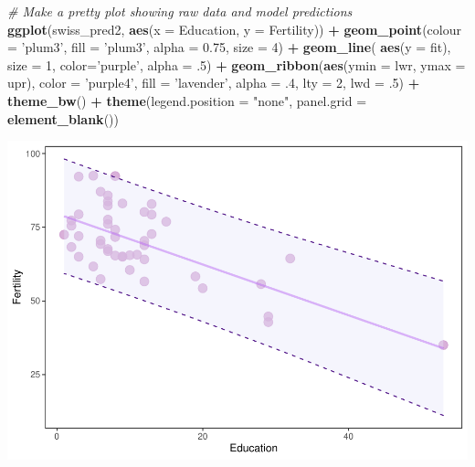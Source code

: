 \documentclass[
]{book}
\newenvironment{Shaded}{\begin{snugshade}}{\end{snugshade}}
\newcommand{\CommentTok}[1]{\textcolor[rgb]{0.56,0.35,0.01}{\textit{#1}}}
\newcommand{\DataTypeTok}[1]{\textcolor[rgb]{0.13,0.29,0.53}{#1}}
\newcommand{\DecValTok}[1]{\textcolor[rgb]{0.00,0.00,0.81}{#1}}
\newcommand{\FloatTok}[1]{\textcolor[rgb]{0.00,0.00,0.81}{#1}}
\newcommand{\KeywordTok}[1]{\textcolor[rgb]{0.13,0.29,0.53}{\textbf{#1}}}
\newcommand{\NormalTok}[1]{#1}
\newcommand{\OperatorTok}[1]{\textcolor[rgb]{0.81,0.36,0.00}{\textbf{#1}}}
\newcommand{\StringTok}[1]{\textcolor[rgb]{0.31,0.60,0.02}{#1}}
\begin{document}
\begin{Shaded}
\begin{Highlighting}[]
\CommentTok{# Make a pretty plot showing raw data and model predictions}
\KeywordTok{ggplot}\NormalTok{(swiss_pred2, }\KeywordTok{aes}\NormalTok{(}\DataTypeTok{x =}\NormalTok{ Education, }\DataTypeTok{y =}\NormalTok{ Fertility)) }\OperatorTok{+}
\StringTok{  }\KeywordTok{geom_point}\NormalTok{(}\DataTypeTok{colour =} \StringTok{'plum3'}\NormalTok{, }\DataTypeTok{fill =} \StringTok{'plum3'}\NormalTok{, }\DataTypeTok{alpha =} \FloatTok{0.75}\NormalTok{, }\DataTypeTok{size =} \DecValTok{4}\NormalTok{) }\OperatorTok{+}
\StringTok{  }\KeywordTok{geom_line}\NormalTok{( }\KeywordTok{aes}\NormalTok{(}\DataTypeTok{y =}\NormalTok{ fit), }\DataTypeTok{size =} \DecValTok{1}\NormalTok{, }\DataTypeTok{color=}\StringTok{'purple'}\NormalTok{, }\DataTypeTok{alpha =} \FloatTok{.5}\NormalTok{) }\OperatorTok{+}
\StringTok{  }\KeywordTok{geom_ribbon}\NormalTok{(}\KeywordTok{aes}\NormalTok{(}\DataTypeTok{ymin =}\NormalTok{ lwr, }\DataTypeTok{ymax =}\NormalTok{ upr), }
              \DataTypeTok{color =} \StringTok{'purple4'}\NormalTok{, }
              \DataTypeTok{fill =} \StringTok{'lavender'}\NormalTok{, }
              \DataTypeTok{alpha =} \FloatTok{.4}\NormalTok{,}
              \DataTypeTok{lty =} \DecValTok{2}\NormalTok{,}
              \DataTypeTok{lwd =} \FloatTok{.5}\NormalTok{) }\OperatorTok{+}
\StringTok{  }\KeywordTok{theme_bw}\NormalTok{() }\OperatorTok{+}\StringTok{ }
\StringTok{  }\KeywordTok{theme}\NormalTok{(}\DataTypeTok{legend.position =} \StringTok{"none"}\NormalTok{, }\DataTypeTok{panel.grid =} \KeywordTok{element_blank}\NormalTok{())}
\end{Highlighting}
\end{Shaded}

\includegraphics{worstr_files/figure-latex/unnamed-chunk-286-1.pdf}
\end{document}
